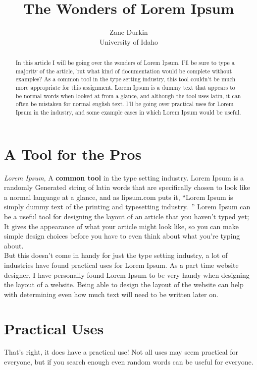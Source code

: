 \documentclass[11pt]{article}
\begin{document}
\title{The Wonders of Lorem Ipsum}

\author{Zane Durkin\\
    University of Idaho}

\maketitle

\begin{abstract}
In this article I will be going over the wonders of Lorem Ipsum. I'll be sure to type a majority of the article, but what kind of documentation would be complete without examples? As a common tool in the type setting industry, this tool couldn't be much more appropriate for this assignment. Lorem Ipsum is a dummy text that appears to be normal words when looked at from a glance, and although the tool uses latin, it can often be mistaken for normal english text. I'll be going over practical uses for Lorem Ipsum in the industry, and some example cases in which Lorem Ipsum would be useful.
\end{abstract}

\section{A Tool for the Pros}
\textit{Lorem Ipsum}, A \textbf{common tool} in the type setting industry. Lorem Ipsum is a randomly Generated string of latin words that are specifically chosen to look like a normal language at a glance, and as lipsum.com puts it, ``Lorem Ipsum is simply dummy text of the printing and typesetting industry.~\cite{Lipsum}'' Lorem Ipsum can be a useful tool for designing the layout of an article that you haven't typed yet; It gives the appearance of what your article might look like, so you can make simple design choices before you have to even think about what you're typing about.\\ \indent
But this doesn't come in handy for just the type setting industry, a lot of industries have found practical uses for Lorem Ipsum. As a part time website designer, I have personally found Lorem Ipsum to be very handy when designing the layout of a website. Being able to design the layout of the website can help with determining even how much text will need to be written later on.

\section{Practical Uses}
That's right, it does have a practical use! Not all uses may seem practical for everyone, but if you search enough even random words can be useful for everyone.
\end{document}
